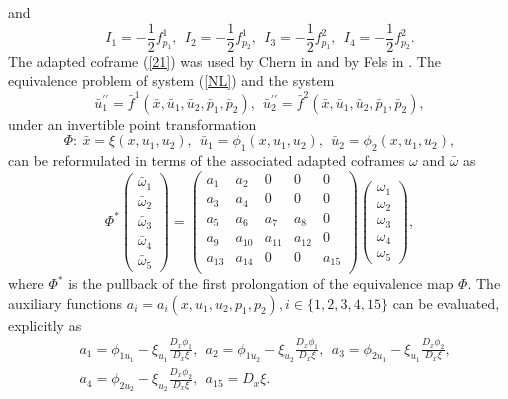 \documentclass[12pt]{article}
\begin{document}
and 
\begin{equation}\label{106}
I_1=-\frac{1}{2}f^1_{p_1},~~ I_2=-\frac{1}{2}f^1_{p_2}, ~~I_3=-\frac{1}{2}f^2_{p_1},~~ I_4=-\frac{1}{2}f^2_{p_2}.
\end{equation}
The adapted coframe (\ref{21}) was used by Chern in \cite{R3} and by Fels in \cite{p15}. The equivalence problem of system (\ref{NL}) and the system 
\begin{equation}\label{S2}
\bar{u}^{\prime\prime}_{1}=\bar{f}^1(\bar{x},\bar{u}_1,\bar{u}_2,\bar{p}_1,\bar{p}_2),~~\bar{u}^{\prime\prime}_{2}=\bar{f}^2(\bar{x},\bar{u}_1,\bar{u}_2,\bar{p}_1,\bar{p}_2),
\end{equation}
  under an invertible point transformation
\begin{equation}\label{T1}
\Phi:~\bar{x}=\xi(x,u_1,u_2),~~\bar{u}_1=\phi_1(x,u_1,u_2),~~\bar{u}_2=\phi_2(x,u_1,u_2),
\end{equation}
can be reformulated in terms of the associated adapted coframes $\omega$ and $\bar{\omega}$ as 
\begin{equation}
\Phi^*
\begin{pmatrix}
\bar{\omega}_1\\
\bar{\omega}_2\\
\bar{\omega}_3\\
\bar{\omega}_4\\
\bar{\omega}_5
\end{pmatrix}=\begin{pmatrix}
a_1&a_2&0&0&0\\
a_3&a_4&0&0&0\\
a_5&a_6&a_7&a_8&0\\
a_9&a_{10}&a_{11}&a_{12}&0\\
a_{13}&a_{14}&0&0&a_{15}\\
\end{pmatrix}\begin{pmatrix}
\omega_1\\
\omega_2\\
\omega_3\\
\omega_4\\
\omega_5
\end{pmatrix},
\end{equation}
where $\Phi^*$ is the pullback of the first prolongation of the equivalence map $\Phi$. The auxiliary functions $a_i=a_i(x,u_1,u_2,p_1,p_2),i\in\{1,2,3,4,15\}$ can be evaluated, explicitly as 
\begin{equation}\label{as}
\begin{aligned}
&a_1=\phi_{1u_1}-\xi_{u_1}\frac{D_x\phi_1}{D_x\xi},~~a_2=\phi_{1u_2}-\xi_{u_2}\frac{D_x\phi_1}{D_x\xi},~~a_3=\phi_{2u_1}-\xi_{u_1}\frac{D_x\phi_2}{D_x\xi},\\
&a_4=\phi_{2u_2}-\xi_{u_2}\frac{D_x\phi_2}{D_x\xi}, ~~a_{15}=D_x\xi.
\end{aligned}\end{equation}
\end{document}
